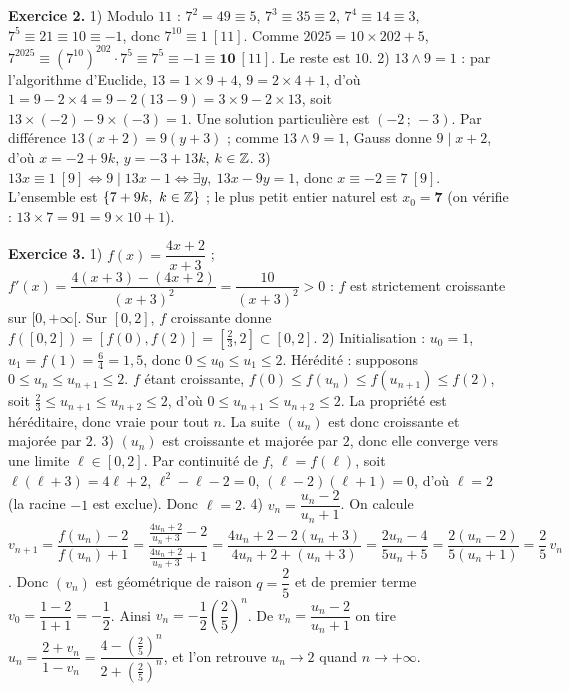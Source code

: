 \smallskip
\noindent\textbf{Exercice 2.}
1) Modulo $11$ : $7^2=49\equiv5$, $7^3\equiv35\equiv2$, $7^4\equiv14\equiv3$,
$7^5\equiv21\equiv10\equiv-1$, donc $7^{10}\equiv1\ [11]$. Comme $2025=10\times202+5$,
$7^{2025}\equiv(7^{10})^{202}\cdot7^5\equiv7^5\equiv-1\equiv\mathbf{10}\ [11]$. Le reste est $10$.
2) $13\wedge9=1$ : par l'algorithme d'Euclide, $13=1\times9+4$, $9=2\times4+1$, d'où
$1=9-2\times4=9-2(13-9)=3\times9-2\times13$, soit $13\times(-2)-9\times(-3)=1$. Une
solution particulière est $(-2\,;\,-3)$. Par différence $13(x+2)=9(y+3)$ ; comme
$13\wedge9=1$, Gauss donne $9\mid x+2$, d'où $x=-2+9k$, $y=-3+13k$, $k\in\mathbb{Z}$.
3) $13x\equiv1\ [9]\iff 9\mid 13x-1\iff \exists y,\ 13x-9y=1$, donc $x\equiv-2\equiv7\ [9]$.
L'ensemble est $\{7+9k,\ k\in\mathbb{Z}\}$ ; le plus petit entier naturel est $x_0=\mathbf{7}$
(on vérifie : $13\times7=91=9\times10+1$).

\smallskip
\noindent\textbf{Exercice 3.}
1) $f(x)=\dfrac{4x+2}{x+3}$ ; $f'(x)=\dfrac{4(x+3)-(4x+2)}{(x+3)^2}=\dfrac{10}{(x+3)^2}>0$ :
$f$ est strictement croissante sur $[0,+\infty[$. Sur $[0,2]$, $f$ croissante donne
$f([0,2])=[f(0),f(2)]=[\tfrac23,2]\subset[0,2]$.
2) Initialisation : $u_0=1$, $u_1=f(1)=\tfrac{6}{4}=1{,}5$, donc $0\le u_0\le u_1\le2$.
Hérédité : supposons $0\le u_n\le u_{n+1}\le2$. $f$ étant croissante,
$f(0)\le f(u_n)\le f(u_{n+1})\le f(2)$, soit $\tfrac23\le u_{n+1}\le u_{n+2}\le2$,
d'où $0\le u_{n+1}\le u_{n+2}\le2$. La propriété est héréditaire, donc vraie pour tout $n$.
La suite $(u_n)$ est donc croissante et majorée par $2$.
3) $(u_n)$ est croissante et majorée par $2$, donc elle converge vers une limite
$\ell\in[0,2]$. Par continuité de $f$, $\ell=f(\ell)$, soit $\ell(\ell+3)=4\ell+2$,
$\ell^2-\ell-2=0$, $(\ell-2)(\ell+1)=0$, d'où $\ell=2$ (la racine $-1$ est exclue).
Donc $\boxed{\ell=2}$.
4) $v_n=\dfrac{u_n-2}{u_n+1}$. On calcule
$v_{n+1}=\dfrac{f(u_n)-2}{f(u_n)+1}
=\dfrac{\frac{4u_n+2}{u_n+3}-2}{\frac{4u_n+2}{u_n+3}+1}
=\dfrac{4u_n+2-2(u_n+3)}{4u_n+2+(u_n+3)}
=\dfrac{2u_n-4}{5u_n+5}=\dfrac{2(u_n-2)}{5(u_n+1)}=\dfrac{2}{5}\,v_n$.
Donc $(v_n)$ est géométrique de raison $q=\dfrac25$ et de premier terme
$v_0=\dfrac{1-2}{1+1}=-\dfrac12$. Ainsi $v_n=-\dfrac12\left(\dfrac25\right)^n$. De
$v_n=\dfrac{u_n-2}{u_n+1}$ on tire $u_n=\dfrac{2+v_n}{1-v_n}=\dfrac{4-\left(\frac25\right)^n}{2+\left(\frac25\right)^n}$,
et l'on retrouve $u_n\to2$ quand $n\to+\infty$.

